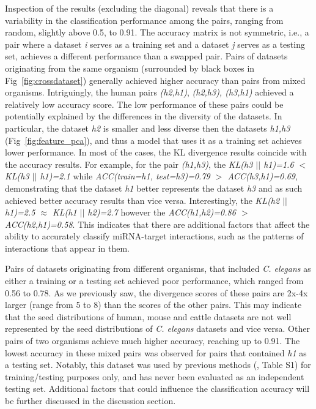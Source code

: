 \documentclass{bmcart}
\begin{document}
Inspection of the results (excluding the diagonal) reveals that there is a variability in the classification performance among the pairs, ranging from random, slightly above 0.5, to 0.91. The accuracy matrix is not symmetric, i.e., a pair where a dataset \textit{i} serves as a training set and a dataset \textit{j} serves as a testing set, achieves a different performance than a swapped pair. Pairs of datasets originating from the same organism (surrounded by black boxes in Fig~\ref{fig:crossdataset}) generally achieved higher accuracy than pairs from mixed organisms. Intriguingly, the human pairs \textit{(h2,h1)}, \textit{(h2,h3), \textit{(h3,h1)}} achieved a relatively low accuracy score. The low performance of these pairs could be potentially explained by the differences in the diversity of the datasets. In particular, the dataset \textit{h2} is smaller and less diverse then the datasets \textit{h1,h3} (Fig~\ref{fig:feature_pca}), and thus a model that uses it as a training set achieves lower performance. In most of the cases, the KL divergence results coincide with the accuracy results. For example, for the pair \textit{(h1,h3)}, the \textit{KL(h3 $||$ h1)=1.6 $<$ KL(h3 $||$ h1)=2.1} while \textit{ACC(train=h1, test=h3)=0.79 $>$ ACC(h3,h1)=0.69}, demonstrating that the dataset \textit{h1} better represents the dataset \textit{h3} and as such achieved better accuracy results than vice versa. Interestingly, the \textit{KL(h2 $||$ h1)=2.5 $\approx$ KL(h1 $||$ h2)=2.7} however the \textit{ACC(h1,h2)=0.86 $>$ ACC(h2,h1)=0.58}. This indicates that there are additional factors that affect the ability to accurately classify miRNA-target interactions, such as the patterns of interactions that appear in them.

Pairs of datasets originating from different organisms, that included \textit{C. elegans} as either a training or a testing set achieved poor performance, which ranged from 0.56 to 0.78. As we previously saw, the divergence scores of these pairs are 2x-4x larger (range from 5 to 8) than the scores of the other pairs. This may indicate that the seed distributions of human, mouse and cattle datasets are not well represented by the seed distributions of \textit{C. elegans} datasets and vice versa. Other pairs of two organisms achieve much higher accuracy, reaching up to 0.91. The lowest accuracy in these mixed pairs was observed for pairs that contained \textit{h1} as a testing set. Notably, this dataset was used by previous methods (, Table S1) for training/testing purposes only, and has never been evaluated as an independent testing set.   Additional factors that could influence the classification accuracy will be further discussed in the discussion section.
\end{document}
